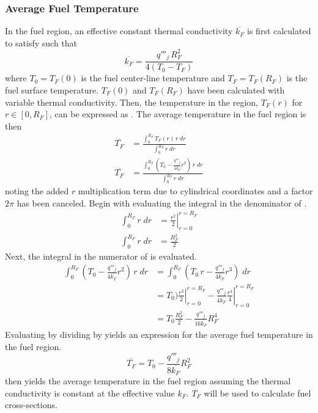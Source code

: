     \subsubsection{Average Fuel Temperature}
      In the fuel region, an effective constant thermal conductivity
      $\overline{k_F}$ is first calculated to satisfy
       such that
      \begin{equation}
        \overline{k_F} = \frac{q'''_j \, R_F^2}{4(T_0-T_F)}
      \end{equation}
      where $T_0 = T_F(0)$ is the fuel center-line temperature and
      $T_F=T_F(R_F)$ is the fuel surface temperature.
      $T_F(0)$ and $T_F(R_F)$ have been calculated with variable thermal
      conductivity. Then, the temperature in the region, $T_F(r)$ for $r \in 
      [0,R_F]$, can be expressed as . The average temperature in
      the fuel region is then
      \begin{align}
        \overline{T_F} &= \frac{\int_0^{R_F} T_F(r) \, r \; dr}
          {\int_0^{R_F} r \; dr} \\
        \label{eq:tfbar_integral}
        \overline{T_F} &= \frac{\int_0^{R_F} \left( T_0 - 
          \frac{q'''_j}{4 \overline{k_F}}
          r^2\right) \, r \; dr}{\int_0^{R_F} r \; dr}
      \end{align}
      noting the added $r$ multiplication term due to cylindrical coordinates
      and a factor $2 \pi$ has been canceled.
      Begin with evaluating the integral in the denominator of
      .
      \begin{align}
        \int_0^{R_F} r \; dr &= \left. \frac{r^2}{2} \right|_{r=0}^{r=R_F} \\
        \label{eq:tf_denominator}
        \int_0^{R_F} r \; dr &= \frac{R_F^2}{2}
      \end{align}
      Next, the integral in the numerator of  is 
      evaluated.
      \begin{align}
        \int_0^{R_F} \left( T_0 - \frac{q'''_j}{4 \overline{k_F}} r^2 \right)
          \, r \; dr&= 
          \int_0^{R_F} \left( T_0 \, r - \frac{q'''_j}{4\overline{k_F}} 
          r^3 \right) \; dr\\
        &= \left. T_0) \frac{r^2}{2} \right|_{r=0}^{r=R_F} -
          \left. \frac{q'''_j}{4 \overline{k_F}} \frac{r^4}{4} 
          \right|_{r=0}^{r=R_F} \\
        \label{eq:tf_numerator}
        &= T_0 \frac{R_F^2}{2} - \frac{q'''_j}{16 \overline{k_F}} R_F^4
      \end{align}
      Evaluating  by dividing  by
       yields an expression for the average fuel
      temperature in the fuel region.
      \begin{equation}
        \label{eq:tf_bar}
        \overline{T_F} = T_0 - \frac{q'''_j}{8 \overline{k_F}} R_F^2
      \end{equation}
       then yields the average temperature in the fuel region
      assuming the thermal conductivity is constant at the effective value
      $k_F$. $\overline{T_F}$ will be used to calculate fuel cross-sections. 

